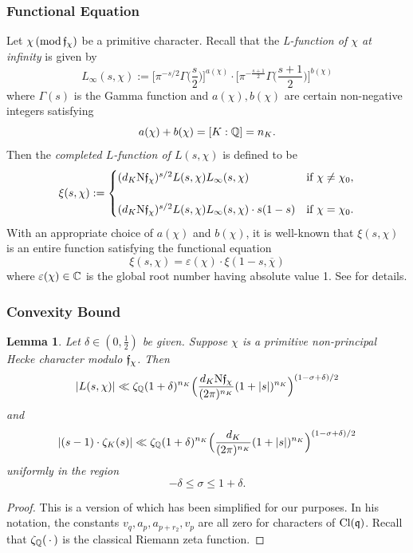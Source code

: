 \documentclass[12pt,psamsfonts]{amsart}
\newtheorem{lem}[thm]{Lemma}
\theoremstyle{definition}
\theoremstyle{remark}
\numberwithin{equation}{section}
\newcounter{notation}
\begin{document}
\subsubsection*{Functional Equation}
\label{subsec:FuncEqn}
Let $\chi \, (\mathrm{mod} {\, \mathfrak{f}_{\chi}})$ be a primitive character. Recall that the \emph{L-function of $\chi$ at infinity} is given by
\begin{equation}
L_{\infty}(s,\chi) := \Big[ \pi^{-s/2} \Gamma\Big( \frac{s}{2}\Big) \Big]^{a(\chi)} \cdot \Big[ \pi^{-\frac{s+1}{2}} \Gamma\Big( \frac{s+1}{2} \Big) \Big]^{b(\chi)}
\label{L-Infinite}
\end{equation}
where $\Gamma(s)$ is the Gamma function and $a(\chi), b(\chi)$ are certain non-negative integers satisfying 
\[
a(\chi) + b(\chi) = [K:\mathbb{Q}] = n_K.
\]
Then the \emph{completed $L$-function of $L(s,\chi)$} is defined to be
\begin{equation}
\xi(s,\chi) := \begin{cases}  (d_K\mathrm{N}\mathfrak{f}_{\chi})^{s/2} L(s,\chi) L_{\infty}(s,\chi) & \text{if } \chi \neq \chi_0, \\\\
 (d_K\mathrm{N}\mathfrak{f}_{\chi})^{s/2} L(s,\chi) L_{\infty}(s,\chi)  \cdot  s(1-s) & \text{if } \chi = \chi_0.
 \end{cases}
 \label{L-completed}
\end{equation}
With an appropriate choice of $a(\chi)$ and $b(\chi)$, it is well-known that $\xi(s,\chi)$ is an entire function satisfying the functional equation
\begin{equation}
\xi(s,\chi) = \varepsilon(\chi)  \cdot \xi(1-s,\overline{\chi})
\label{FunctionalEquation}
\end{equation}
where $\varepsilon(\chi) \in \mathbb{C}$ is the global root number having absolute value 1. See \cite[Section 5]{LO} for details. 

\subsubsection*{Convexity Bound} 

\begin{lem} \label{ConvexityBd} Let $\delta \in (0,\tfrac{1}{2})$ be given. Suppose  $\chi$ is a primitive non-principal Hecke character modulo $\mathfrak{f}_{\chi}$. Then
\[
|L(s,\chi)| \ll  \zeta_{\mathbb{Q}}(1+\delta)^{n_K} \Big( \frac{d_K \mathrm{N}\mathfrak{f}_{\chi}}{ (2\pi)^{n_K}} (1+|s|)^{n_K} \Big)^{(1-\sigma+\delta)/2}
\]
and
\[
|(s-1) \cdot \zeta_K(s)| \ll  \zeta_{\mathbb{Q}}(1+\delta)^{n_K} \Big( \frac{d_K}{ (2\pi)^{n_K}} (1+|s|)^{n_K} \Big)^{(1-\sigma+\delta)/2}
\]
uniformly in the region
\[
-\delta \leq \sigma \leq 1+\delta. 
\]  
\end{lem} 
\begin{proof} This is a version of \cite[Theorem 5]{Rademacher} which has been simplified for our purposes. In his notation, the constants $v_q, a_p, a_{p+r_2}, v_p$ are all zero for characters of $\mathrm{Cl}(\mathfrak{q})$. Recall that $\zeta_{\mathbb{Q}}(\, \cdot \,)$ is the classical Riemann zeta function. 
\end{proof}
\end{document}
